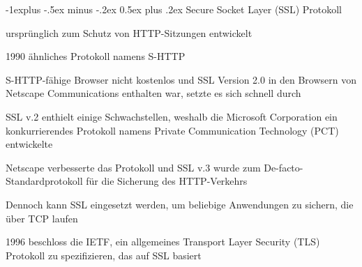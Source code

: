 \documentclass[a4paper]{article}
\makeatletter
\renewcommand{\subsection}{\@startsection{subsection}{2}{0mm}%
 {-1explus -.5ex minus -.2ex}%
 {0.5ex plus .2ex}%
 {\normalfont\normalsize\bfseries}}
\makeatother
\begin{document}
\begin{multicols}{3}
      \subsection{Secure Socket Layer (SSL) Protokoll}
      \begin{itemize*}
            \item ursprünglich zum Schutz von HTTP-Sitzungen entwickelt
            \item 1990 ähnliches Protokoll namens S-HTTP
            \item S-HTTP-fähige Browser nicht kostenlos und SSL Version 2.0 in den Browsern von Netscape Communications enthalten war, setzte es sich schnell durch
            \item SSL v.2 enthielt einige Schwachstellen, weshalb die Microsoft Corporation ein konkurrierendes Protokoll namens Private Communication Technology (PCT) entwickelte
            \item Netscape verbesserte das Protokoll und SSL v.3 wurde zum De-facto-Standardprotokoll für die Sicherung des HTTP-Verkehrs
            \item Dennoch kann SSL eingesetzt werden, um beliebige Anwendungen zu sichern, die über TCP laufen
            \item 1996 beschloss die IETF, ein allgemeines Transport Layer Security (TLS) Protokoll zu spezifizieren, das auf SSL basiert
      \end{itemize*}


\end{multicols}
\end{document}
